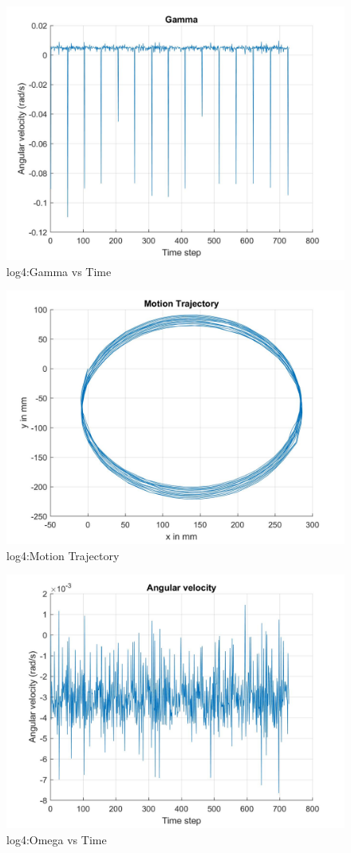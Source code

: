 \documentclass[paper=a4, fontsize=11pt]{scrartcl} %
\numberwithin{equation}{section} %
\numberwithin{figure}{section} %
\numberwithin{table}{section} %
\begin{document}
\begin{appendix}
\begin{figure}[H]
	\centering
	\includegraphics[width = 0.6\linewidth]{./figures/log4/gammaVsTime.jpg}
	\caption{log4:Gamma vs Time}
\end{figure}

\begin{figure}[H]
	\centering
	\includegraphics[width = 0.6\linewidth]{./figures/log4/motionTrajectory.jpg}
	\caption{log4:Motion Trajectory}
\end{figure}

\begin{figure}[H]
	\centering
	\includegraphics[width = 0.6\linewidth]{./figures/log4/omegaVsTime.jpg}
	\caption{log4:Omega vs Time}
\end{figure}


\end{appendix}
\end{document}
